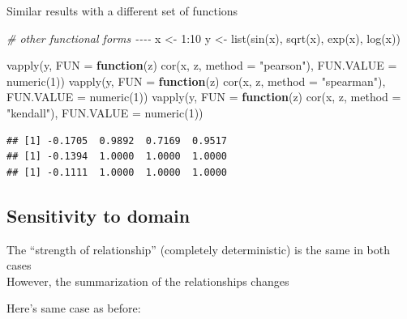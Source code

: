 \documentclass[
]{krantz}
\makeatletter
\newenvironment{Shaded}{\begin{snugshade}}{\end{snugshade}}
\newcommand{\AttributeTok}[1]{\textcolor[rgb]{0.61,0.61,0.61}{#1}}
\newcommand{\CommentTok}[1]{\textcolor[rgb]{0.37,0.37,0.37}{\textit{#1}}}
\newcommand{\ControlFlowTok}[1]{\textcolor[rgb]{0.27,0.27,0.27}{\textbf{#1}}}
\newcommand{\DecValTok}[1]{\textcolor[rgb]{0.06,0.06,0.06}{#1}}
\newcommand{\FunctionTok}[1]{\textcolor[rgb]{0,0,0}{#1}}
\newcommand{\NormalTok}[1]{#1}
\newcommand{\OtherTok}[1]{\textcolor[rgb]{0.37,0.37,0.37}{#1}}
\newcommand{\SpecialCharTok}[1]{\textcolor[rgb]{0,0,0}{#1}}
\newcommand{\StringTok}[1]{\textcolor[rgb]{0.5,0.5,0.5}{#1}}
\newenvironment{kframe}{%
\medskip{}
\setlength{\fboxsep}{.8em}
 \def\at@end@of@kframe{}%
 \ifinner\ifhmode%
  \def\at@end@of@kframe{\end{minipage}}%
  \begin{minipage}{\columnwidth}%
 \fi\fi%
 \def\FrameCommand##1{\hskip\@totalleftmargin \hskip-\fboxsep
 \colorbox{shadecolor}{##1}\hskip-\fboxsep
     \hskip-\linewidth \hskip-\@totalleftmargin \hskip\columnwidth}%
 \MakeFramed {\advance\hsize-\width
   \@totalleftmargin\z@ \linewidth\hsize
   \@setminipage}}%
 {\par\unskip\endMakeFramed%
 \at@end@of@kframe}
\renewenvironment{Shaded}{\begin{kframe}}{\end{kframe}}
\makeatother
\begin{document}
Similar results with a different set of functions

\begin{Shaded}
\begin{Highlighting}[]
\CommentTok{\# other functional forms {-}{-}{-}{-}}
\NormalTok{x }\OtherTok{\textless{}{-}} \DecValTok{1}\SpecialCharTok{:}\DecValTok{10}
\NormalTok{y }\OtherTok{\textless{}{-}} \FunctionTok{list}\NormalTok{(}\FunctionTok{sin}\NormalTok{(x), }\FunctionTok{sqrt}\NormalTok{(x), }\FunctionTok{exp}\NormalTok{(x), }\FunctionTok{log}\NormalTok{(x))}

\FunctionTok{vapply}\NormalTok{(y, }\AttributeTok{FUN =} \ControlFlowTok{function}\NormalTok{(z) }\FunctionTok{cor}\NormalTok{(x, z, }\AttributeTok{method =} \StringTok{"pearson"}\NormalTok{), }\AttributeTok{FUN.VALUE =} \FunctionTok{numeric}\NormalTok{(}\DecValTok{1}\NormalTok{))}
\FunctionTok{vapply}\NormalTok{(y, }\AttributeTok{FUN =} \ControlFlowTok{function}\NormalTok{(z) }\FunctionTok{cor}\NormalTok{(x, z, }\AttributeTok{method =} \StringTok{"spearman"}\NormalTok{), }\AttributeTok{FUN.VALUE =} \FunctionTok{numeric}\NormalTok{(}\DecValTok{1}\NormalTok{))}
\FunctionTok{vapply}\NormalTok{(y, }\AttributeTok{FUN =} \ControlFlowTok{function}\NormalTok{(z) }\FunctionTok{cor}\NormalTok{(x, z, }\AttributeTok{method =} \StringTok{"kendall"}\NormalTok{), }\AttributeTok{FUN.VALUE =} \FunctionTok{numeric}\NormalTok{(}\DecValTok{1}\NormalTok{))}
\end{Highlighting}
\end{Shaded}

\begin{verbatim}
## [1] -0.1705  0.9892  0.7169  0.9517
## [1] -0.1394  1.0000  1.0000  1.0000
## [1] -0.1111  1.0000  1.0000  1.0000
\end{verbatim}

\hypertarget{sensitivity-to-domain}{%
\subsection{Sensitivity to domain}\label{sensitivity-to-domain}}

The ``strength of relationship'' (completely deterministic) is the same in both cases\\
However, the summarization of the relationships changes

Here's same case as before:
\end{document}
